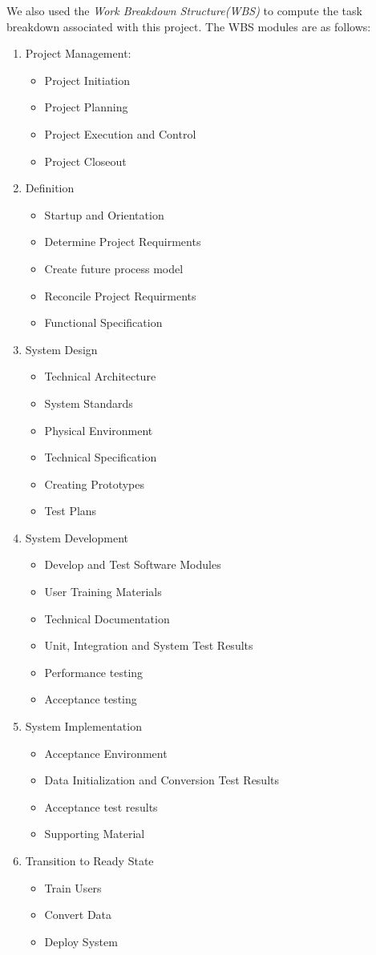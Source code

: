 \newpage
We also used the \emph{Work Breakdown Structure(WBS)} to compute the task breakdown associated with this project. The WBS modules are as follows:

\begin{enumerate}
\item Project Management:
\begin{itemize}
\item Project Initiation
\item Project Planning
\item Project Execution and Control
\item Project Closeout
\end{itemize}

\item Definition
\begin{itemize}
\item Startup and Orientation
\item Determine Project Requirments
\item Create future process model
\item Reconcile Project Requirments
\item Functional Specification 
\end{itemize}

\item System Design
\begin{itemize}
\item Technical Architecture
\item System Standards
\item Physical Environment
\item Technical Specification
\item Creating Prototypes
\item Test Plans
\end{itemize}

\item System Development
\begin{itemize}
\item Develop and Test Software Modules
\item User Training Materials
\item Technical Documentation
\item Unit, Integration and System Test Results
\item Performance testing
\item Acceptance testing
\end{itemize}

\item System Implementation
\begin{itemize}
\item Acceptance Environment
\item Data Initialization and Conversion Test Results
\item Acceptance test results
\item Supporting Material
\end{itemize}

\item Transition to Ready State
\begin{itemize}
\item Train Users
\item Convert Data
\item Deploy System
\end{itemize}
\end{enumerate}